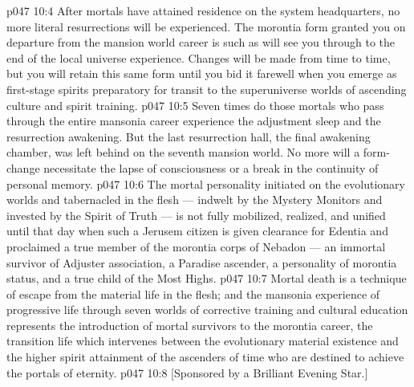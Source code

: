 \vs p047 10:4 \pc After mortals have attained residence on the system headquarters, no more literal resurrections will be experienced. The morontia form granted you on departure from the mansion world career is such as will see you through to the end of the local universe experience. Changes will be made from time to time, but you will retain this same form until you bid it farewell when you emerge as first\hyp{}stage spirits preparatory for transit to the superuniverse worlds of ascending culture and spirit training.
\vs p047 10:5 Seven times do those mortals who pass through the entire mansonia career experience the adjustment sleep and the resurrection awakening. But the last resurrection hall, the final awakening chamber, was left behind on the seventh mansion world. No more will a form\hyp{}change necessitate the lapse of consciousness or a break in the continuity of personal memory.
\vs p047 10:6 \pc The mortal personality initiated on the evolutionary worlds and tabernacled in the flesh --- indwelt by the Mystery Monitors and invested by the Spirit of Truth --- is not fully mobilized, realized, and unified until that day when such a Jerusem citizen is given clearance for Edentia and proclaimed a true member of the morontia corps of Nebadon --- an immortal survivor of Adjuster association, a Paradise ascender, a personality of morontia status, and a true child of the Most Highs.
\vs p047 10:7 \pc Mortal death is a technique of escape from the material life in the flesh; and the mansonia experience of progressive life through seven worlds of corrective training and cultural education represents the introduction of mortal survivors to the morontia career, the transition life which intervenes between the evolutionary material existence and the higher spirit attainment of the ascenders of time who are destined to achieve the portals of eternity.
\vsetoff
\vs p047 10:8 [Sponsored by a Brilliant Evening Star.]
